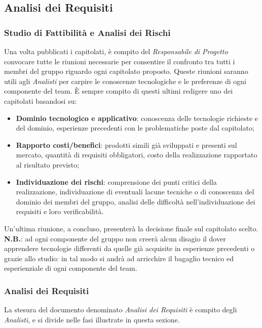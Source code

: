 \subsection{Analisi dei Requisiti}
\subsubsection{Studio di Fattibilità e Analisi dei Rischi}
Una volta pubblicati i capitolati, è compito del \textit{Responsabile di Progetto} convocare tutte le riunioni necessarie per consentire il confronto tra tutti i membri del gruppo riguardo ogni capitolato proposto. Queste riunioni saranno utili agli \textit{Analisti} per carpire le conoscenze tecnologiche e le preferenze di ogni componente del team. È sempre compito di questi ultimi redigere uno \StudioDiFattibilita{} dei capitolati basandosi su:
\begin{itemize}
\item \textbf{Dominio tecnologico e applicativo}: conoscenza delle tecnologie richieste e del dominio, esperienze precedenti con le problematiche poste dal capitolato;
\item \textbf{Rapporto costi/benefici}: prodotti simili già sviluppati e presenti sul mercato, quantità di requisiti obbligatori, costo della realizzazione rapportato al risultato previsto;
\item \textbf{Individuazione dei rischi}: comprensione dei punti critici della realizzazione, individuazione di eventuali lacune tecniche o di conoscenza del dominio dei membri del gruppo, analisi delle difficoltà nell'individuazione dei requisiti e loro verificabilità.
\end{itemize}
Un'ultima riunione, a \StudioDiFattibilita{} concluso, presenterà la decisione finale sul capitolato scelto. \\
\textbf{N.B.}: ad ogni componente del gruppo non creerà alcun disagio il dover apprendere tecnologie differenti da quelle già acquisite in esperienze precedenti o grazie allo studio: in tal modo si andrà ad arricchire il bagaglio tecnico ed esperienziale di ogni componente del team.

\subsubsection{Analisi dei Requisiti}
La stesura del documento denominato \textit{Analisi dei Requisiti} è compito degli \textit{Analisti}, e si divide nelle fasi illustrate in questa sezione.

